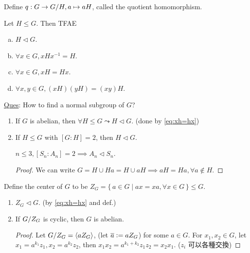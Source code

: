 \begin{remark}
  Define $q: G \to {G}/{H}, a \mapsto aH$, called the quotient homomorphism.
\end{remark}

\begin{exercise}
  Let $H \le G$. Then TFAE
  \begin{enumerate}[(a)]
    \item $H \lhd G$.
    \item $\forall x \in G, xHx^{-1} = H$.
    \item $\forall x \in G, xH = Hx$. \label{eq:xh=hx}
    \item $\forall x, y \in G, (xH)(yH) = (xy)H$.
  \end{enumerate}
\end{exercise}

\underline{Ques}: How to find a normal subgroup of $G$?

\begin{prop} \mbox{}
  \begin{enumerate}
    \item If $G$ is abelian, then $\forall H \le G \leadsto H \lhd G$.
      (done by \ref{eq:xh=hx})
    \item If $H \le G$ with $[G:H] = 2$, then $H \lhd G$.
      \begin{example}
        $n \le 3, [S_n:A_n] = 2 \implies A_n \lhd S_n$.
      \end{example}
      \begin{proof}
        We can write $G = H \cup Ha = H \cup aH \implies aH = Ha,
        \forall a \not\in H$.
      \end{proof}
  \end{enumerate}
\end{prop}

\begin{definition}
  Define the center of $G$ to be $Z_G = \{\, a \in G
  \mid ax = xa, \forall x \in G \,\} \le G$.
\end{definition}

\begin{prop} \mbox{}
  \begin{enumerate}
    \item $Z_G \lhd G$. (by \ref{eq:xh=hx} and def.)
    \item If ${G}/{Z_G}$ is cyclic, then $G$ is abelian.
      \begin{proof}
        Let ${G}/{Z_G} = \langle aZ_G\rangle$, (let $\overline{a} \vcentcolon= aZ_G$) for some
        $a \in G$.
        For $x_1, x_2 \in G$, let $x_1 = a^{k_1}z_1, x_2 = a^{k_2}z_2$, then
        $x_1x_2 = a^{k_1+k_2}z_1z_2 = x_2x_1$. ($z_i$ 可以各種交換)
      \end{proof}
  \end{enumerate}
\end{prop}

